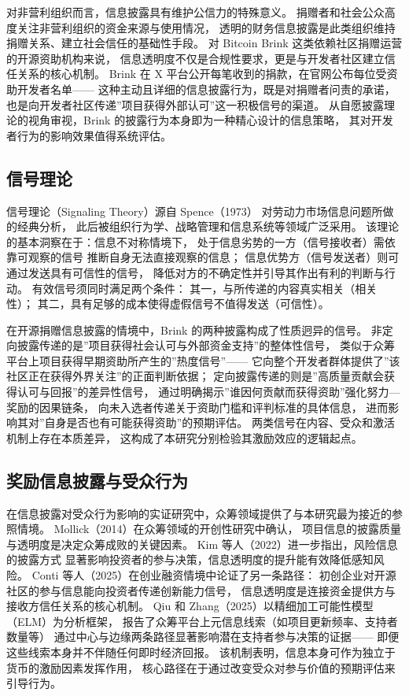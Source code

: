 对非营利组织而言，信息披露具有维护公信力的特殊意义。
捐赠者和社会公众高度关注非营利组织的资金来源与使用情况，
透明的财务信息披露是此类组织维持捐赠关系、建立社会信任的基础性手段\cite{liu2015nonprofit}。
对 Bitcoin Brink 这类依赖社区捐赠运营的开源资助机构来说，
信息透明度不仅是合规性要求，更是与开发者社区建立信任关系的核心机制。
Brink 在 X 平台公开每笔收到的捐款，在官网公布每位受资助开发者名单——
这种主动且详细的信息披露行为，既是对捐赠者问责的承诺，
也是向开发者社区传递”项目获得外部认可”这一积极信号的渠道。
从自愿披露理论的视角审视，Brink 的披露行为本身即为一种精心设计的信息策略，
其对开发者行为的影响效果值得系统评估。

\subsection{信号理论}

信号理论（Signaling Theory）源自 Spence（1973）
对劳动力市场信息问题所做的经典分析\cite{spence1973job}，
此后被组织行为学、战略管理和信息系统等领域广泛采用。
该理论的基本洞察在于：信息不对称情境下，
处于信息劣势的一方（信号接收者）需依靠可观察的信号
推断自身无法直接观察的信息；
信息优势方（信号发送者）则可通过发送具有可信性的信号，
降低对方的不确定性并引导其作出有利的判断与行动。
有效信号须同时满足两个条件：
其一，与所传递的内容真实相关（相关性）；
其二，具有足够的成本使得虚假信号不值得发送（可信性）\cite{connelly2011signaling}。

在开源捐赠信息披露的情境中，Brink 的两种披露构成了性质迥异的信号。
非定向披露传递的是”项目获得社会认可与外部资金支持”的整体性信号，
类似于众筹平台上项目获得早期资助所产生的”热度信号”——
它向整个开发者群体提供了”该社区正在获得外界关注”的正面判断依据；
定向披露传递的则是”高质量贡献会获得认可与回报”的差异性信号，
通过明确揭示”谁因何贡献而获得资助”强化努力—奖励的因果链条，
向未入选者传递关于资助门槛和评判标准的具体信息，
进而影响其对”自身是否也有可能获得资助”的预期评估。
两类信号在内容、受众和激活机制上存在本质差异，
这构成了本研究分别检验其激励效应的逻辑起点。

\subsection{奖励信息披露与受众行为}

在信息披露对受众行为影响的实证研究中，众筹领域提供了与本研究最为接近的参照情境。
Mollick（2014）在众筹领域的开创性研究中确认，
项目信息的披露质量与透明度是决定众筹成败的关键因素\cite{mollick2014dynamics}。
Kim 等人（2022）进一步指出，风险信息的披露方式
显著影响投资者的参与决策，信息透明度的提升能有效降低感知风险\cite{kim2022risk}。
Conti 等人（2025）在创业融资情境中论证了另一条路径：
初创企业对开源社区的参与信息能向投资者传递创新能力信号，
信息透明度是连接资金提供方与接收方信任关系的核心机制\cite{conti2025beefing}。
Qiu 和 Zhang（2025）以精细加工可能性模型（ELM）为分析框架，
报告了众筹平台上元信息线索（如项目更新频率、支持者数量等）
通过中心与边缘两条路径显著影响潜在支持者参与决策的证据——
即便这些线索本身并不伴随任何即时经济回报\cite{qiu2025crowdfunding}。
该机制表明，信息本身可作为独立于货币的激励因素发挥作用，
核心路径在于通过改变受众对参与价值的预期评估来引导行为。

